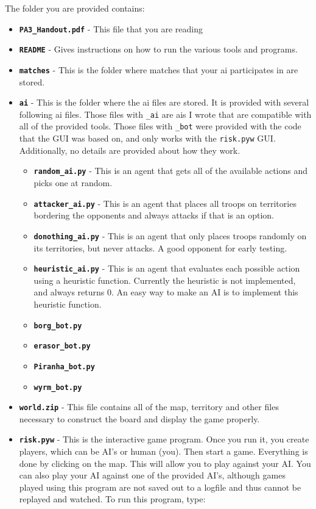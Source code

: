 \documentclass[10pt,a4paper]{article}
\begin{document}
The folder you are provided contains: 
\begin{itemize}
\item \textbf{\texttt{PA3\_Handout.pdf}} - This file that you are reading
\item \textbf{\texttt{README}} - Gives instructions on how to run the various tools and programs.
\item \textbf{\texttt{matches}} - This is the folder where matches that your ai participates in are stored. 
\item \textbf{\texttt{ai}} - This is the folder where the ai files are stored.  It is provided with several following ai files.  Those files with \texttt{\_ai} are ais I wrote that are compatible with all of the provided tools.  Those files with \texttt{\_bot} were provided with the code that the GUI was based on, and only works with the \texttt{risk.pyw} GUI.  Additionally, no details are provided about how they work.
\begin{itemize}
\item \textbf{\texttt{random\_ai.py}} - This is an agent that gets all of the available actions and picks one at random.
\item \textbf{\texttt{attacker\_ai.py}} - This is an agent that places all troops on territories bordering the opponents and always attacks if that is an option.  
\item \textbf{\texttt{donothing\_ai.py}} - This is an agent that only places troops randomly on its territories, but never attacks.  A good opponent for early testing.

\item \textbf{\texttt{heuristic\_ai.py}} - This is an agent that evaluates each possible action using a heuristic function.  Currently the heuristic is not implemented, and always returns 0.  An easy way to make an AI is to implement this heuristic function. 
\item \textbf{\texttt{borg\_bot.py}}
\item \textbf{\texttt{erasor\_bot.py}}
\item \textbf{\texttt{Piranha\_bot.py}}
\item \textbf{\texttt{wyrm\_bot.py}}
\end{itemize}
\item \textbf{\texttt{world.zip}} - This file contains all of the map, territory and other files necessary to construct the board and display the game properly.
\item \textbf{\texttt{risk.pyw}} - This is the interactive game program.  Once you run it, you create players, which can be AI's or human (you).  Then start a game.  Everything is done by clicking on the map. This will allow you to play against your AI.  You can also play your AI against one of the provided AI's, although games played using this program are not saved out to a logfile and thus cannot be replayed and watched. To run this program, type:


\end{itemize}
\end{document}
